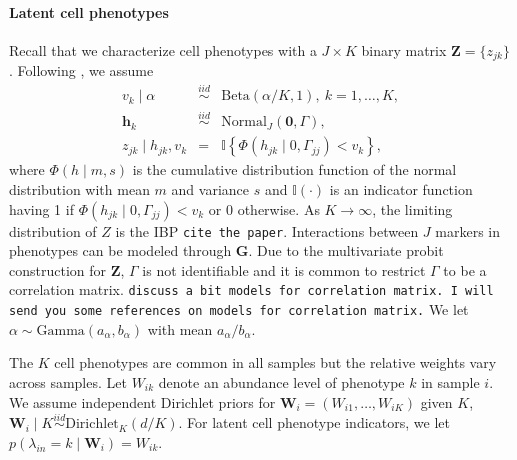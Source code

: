 \documentclass[12pt,]{article}
\newcommand{\N}{ \mathcal{N} }
\newcommand{\iid}{\overset{iid}{\sim}}
\def\N{\text{Normal}}
\def\G{\text{Gamma}}
\def\Dir{\text{Dirichlet}}
\def\Be{\text{Beta}}
\def\lin{\lambda_{in}}
\def\h{\bm{h}}
\def\Z{\bm{Z}}
\begin{document}
\paragraph*{Latent cell phenotypes}  Recall that we characterize cell phenotypes with a $J\times K$ binary matrix \(\Z =\{z_{jk}\}\).  Following \citet{williamson2010dependent}, we assume
\begin{eqnarray*}
v_k \mid \alpha &\iid& \Be(\alpha/K, 1),~ k=1, \ldots, K, \\
\h_k &\iid& \N_J(\bm{0}, \Gamma), \\ 
z_{jk} \mid h_{jk}, v_k &=& \mathbb{I}\left\{ \Phi(h_{jk} \mid 0, \Gamma_{jj}) < v_k \right\},
\end{eqnarray*}
where $\Phi(h \mid m, s)$ is the cumulative distribution function of the normal
distribution with mean $m$ and variance $s$ and $\mathbb{I}(\cdot)$ is an
indicator function having 1 if $\Phi(h_{jk} \mid 0, \Gamma_{jj}) < v_k$ or 0
otherwise.  As $K \rightarrow \infty$, the limiting distribution of $Z$ is the
IBP {\tt cite the paper}.  Interactions between $J$ markers in phenotypes can
be modeled through $\bm G$.  Due to the multivariate probit construction for
$\Z$, $\Gamma$ is not identifiable and it is common to restrict $\Gamma$ to be
a correlation matrix.
%
{\tt discuss a bit models for correlation matrix.  I will send you some
references on models for correlation matrix.}
%
%
We let $\alpha \sim \G(a_\alpha, b_\alpha)$ with mean $a_\alpha/b_\alpha$.  

The $K$ cell phenotypes are common in all samples but the relative weights vary
across samples. Let $W_{ik}$ denote an abundance level of phenotype $k$ in
sample $i$.  We assume independent Dirichlet priors for $\bm W_i=(W_{i1},
\ldots, W_{iK})$ given $K$, $\bm W_{i} \mid K \iid \Dir_K(d/K)$. For latent
cell phenotype indicators, we let $p(\lin=k \mid \bm W_i) = W_{ik}$.
\end{document}
